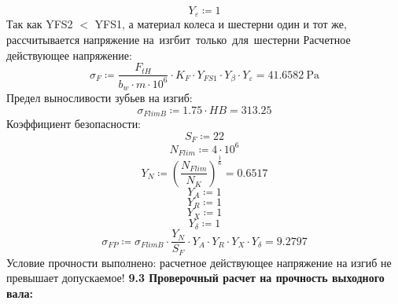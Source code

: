 \documentclass{article}
\newcommand{\defeq}{\coloneq} %
\begin{document}
\begin{equation*}
Y_{ε} \defeq 1
\end{equation*}
\colorbox[HTML]{000000}{Так как YFS2 $<$ YFS1, а материал колеса и шестерни один и тот же, рассчитывается напряжение на изгбит только для шестерни}\newline
\colorbox[HTML]{000000}{Расчетное действующее напряжение:}\newline
\begin{equation*}
σ_{F} \defeq \frac{F_{tH}}{b_{w} \cdot m \cdot 10^{6}} \cdot K_{F} \cdot \textit{Y}_{\textit{FS1}} \cdot Y_{β} \cdot Y_{ε} = {41.6582 \: \mathrm{Pa}}
\end{equation*}
\colorbox[HTML]{000000}{Предел выносливости зубьев на изгиб:}\newline
\begin{equation*}
σ_{FlimB} \defeq 1.75 \cdot HB = {313.25}
\end{equation*}
\colorbox[HTML]{000000}{Коэффициент безопасности:}\newline
\begin{equation*}
S_{F} \defeq 22
\end{equation*}
\begin{equation*}
N_{Flim} \defeq 4 \cdot 10^{6}
\end{equation*}
\begin{equation*}
Y_{N} \defeq \left( \frac{N_{Flim}}{N_{K}} \right)^{\frac{1}{6}} = {0.6517}
\end{equation*}
\begin{equation*}
Y_{A} \defeq 1
\end{equation*}
\begin{equation*}
Y_{R} \defeq 1
\end{equation*}
\begin{equation*}
Y_{X} \defeq 1
\end{equation*}
\begin{equation*}
Y_{δ} \defeq 1
\end{equation*}
\begin{equation*}
σ_{FP} \defeq σ_{FlimB} \cdot \frac{Y_{N}}{S_{F}} \cdot Y_{A} \cdot Y_{R} \cdot Y_{X} \cdot Y_{δ} = {9.2797}
\end{equation*}
\colorbox[HTML]{FFFF80}{Условие прочности выполнено: расчетное действующее напряжение на изгиб не превышает допускаемое!}\newline
\colorbox[HTML]{000000}{\textbf{9.3 Проверочный расчет на прочность выходного вала:}}\newline
\end{document}
